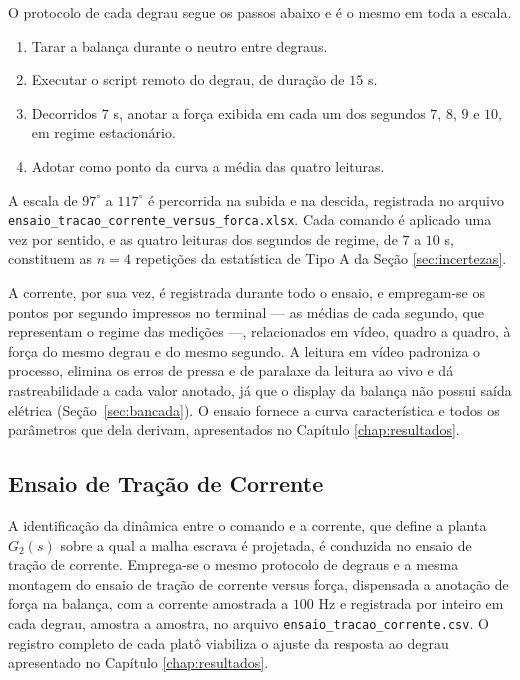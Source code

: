 O protocolo de cada degrau segue os passos abaixo e é o mesmo em toda a escala.

\begin{enumerate}
    \item Tarar a balança durante o neutro entre degraus.
    \item Executar o script remoto do degrau, de duração de $15$ s.
    \item Decorridos $7$ s, anotar a força exibida em cada um dos segundos $7$, $8$, $9$ e
    $10$, em regime estacionário.
    \item Adotar como ponto da curva a média das quatro leituras.
\end{enumerate}

A escala de $97^\circ$ a $117^\circ$ é percorrida na subida e na descida, registrada no
arquivo \texttt{ensaio\_tracao\_corrente\_versus\_forca.xlsx}. Cada comando é aplicado uma
vez por sentido, e as quatro leituras dos segundos de regime, de $7$ a $10$ s, constituem
as $n = 4$ repetições da estatística de Tipo A da Seção \ref{sec:incertezas}.

A corrente, por sua vez, é registrada durante todo o ensaio, e empregam-se os pontos por
segundo impressos no terminal --- as médias de cada segundo, que representam o regime das
medições ---, relacionados em vídeo, quadro a quadro, à força do mesmo degrau e do mesmo
segundo. A leitura em vídeo padroniza o processo, elimina os erros de pressa e de paralaxe
da leitura ao vivo e dá rastreabilidade a cada valor anotado, já que o display da
balança não possui saída elétrica (Seção~\ref{sec:bancada}). O ensaio fornece a curva característica e todos os
parâmetros que dela derivam, apresentados no Capítulo \ref{chap:resultados}.

\subsection{Ensaio de Tração de Corrente}
\label{sec:tracaocorrente}

A identificação da dinâmica entre o comando e a corrente, que define a planta $G_2(s)$ sobre
a qual a malha escrava é projetada, é conduzida no ensaio de tração de corrente. Emprega-se
o mesmo protocolo de degraus e a mesma montagem do ensaio de tração de corrente versus
força, dispensada a anotação de força na balança, com a
corrente amostrada a $100$ Hz e registrada por inteiro em cada degrau, amostra a amostra,
no arquivo \texttt{ensaio\_tracao\_corrente.csv}. O registro completo de cada platô
viabiliza o ajuste da resposta ao degrau apresentado no Capítulo \ref{chap:resultados}.

